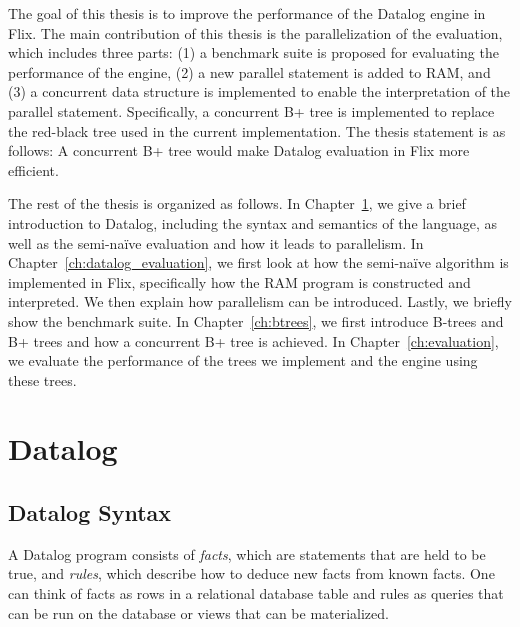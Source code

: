\documentclass[11pt]{report}
\theoremstyle{definition}
\begin{document}
The goal of this thesis is to improve the performance of the Datalog engine in Flix. The main contribution of this thesis is the parallelization of the evaluation, which includes three parts: (1) a benchmark suite is proposed for evaluating the performance of the engine, (2) a new parallel statement is added to RAM, and (3) a concurrent data structure is implemented to enable the interpretation of the parallel statement. Specifically, a concurrent B+ tree is implemented to replace the red-black tree used in the current implementation. The thesis statement is as follows: A concurrent B+ tree would make Datalog evaluation in Flix more efficient.

The rest of the thesis is organized as follows. In Chapter~\ref{ch:datalog}, we give a brief introduction to Datalog, including the syntax and semantics of the language, as well as the semi-naïve evaluation and how it leads to parallelism. In Chapter~\ref{ch:datalog_evaluation}, we first look at how the semi-naïve algorithm is implemented in Flix, specifically how the RAM program is constructed and interpreted. We then explain how parallelism can be introduced. Lastly, we briefly show the benchmark suite. In Chapter~\ref{ch:btrees}, we first introduce B-trees and B+ trees and how a concurrent B+ tree is achieved. In Chapter~\ref{ch:evaluation}, we evaluate the performance of the trees we implement and the engine using these trees.


\chapter{Datalog}
\label{ch:datalog}

\section{Datalog Syntax}

A Datalog program consists of \textit{facts}, which are statements that are held to be true, and \textit{rules}, which describe how to deduce new facts from known facts. One can think of facts as rows in a relational database table and rules as queries that can be run on the database or views that can be materialized.
\end{document}
